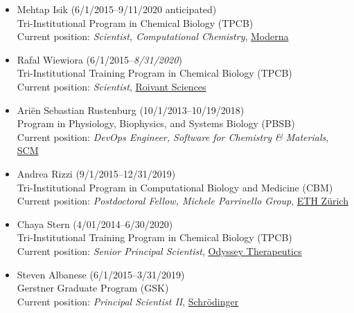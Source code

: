 \documentclass[10pt]{article}
\begin{document}
\begin{itemize}
  \item Mehtap Isik (6/1/2015--9/11/2020 anticipated)\\
  Tri-Institutional Program in Chemical Biology (TPCB)\\
  Current position: \emph{Scientist, Computational Chemistry}, \href{https://www.modernatx.com/}{Moderna}
  
  \item Rafal Wiewiora (6/1/2015--\emph{8/31/2020})\\
  Tri-Institutional Training Program in Chemical Biology (TPCB)\\
  Current position: \emph{Scientist}, \href{redesignscience.com}{Roivant Sciences}
  
  \item Ari\"{e}n Sebastian Rustenburg (10/1/2013--10/19/2018)\\
  Program in Physiology, Biophysics, and Systems Biology (PBSB)\\
  Current position: \emph{DevOps Engineer, Software for Chemistry \& Materials}, \href{https://www.scm.com/}{SCM}

  \item Andrea Rizzi (9/1/2015--12/31/2019)\\
  Tri-Institutional Program in Computational Biology and Medicine (CBM)\\
  Current position: \emph{Postdoctoral Fellow, Michele Parrinello Group}, \href{https://parrinello.ethz.ch/}{ETH Z\"urich}

  \item Chaya Stern (4/01/2014--6/30/2020)\\
  Tri-Institutional Training Program in Chemical Biology (TPCB)\\
  Current position: \emph{Senior Principal Scientist},  \href{https://odysseytx.com/}{Odyssey Therapeutics}
 
  \item Steven Albanese (6/1/2015--3/31/2019)\\
  Gerstner Graduate Program (GSK)\\
  Current position: \emph{Principal Scientist II},  \href{http://www.schrodinger.com}{{Schr\"{o}dinger}}
  

\end{itemize}
\end{document}

